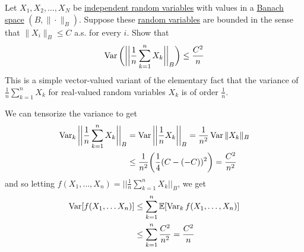   \begin{exercise}
  Let $X_1, X_2, \ldots, X_N$ be \hyperref[prob-def:independent-random-variables]{independent random variables} with values in a \hyperref[mv-def:banach-space]{Banach space} $(B, \|\cdot \|_B)$. Suppose these \hyperref[prob-def:random-variable]{random variables} are bounded in the sense that $\|X_i\|_B \leq C$ a.s. for every $i$. Show that 
  \begin{equation}
    \operatorname{Var}\bigg( \bigg| \bigg| \frac{1}{n} \sum_{k=1}^n X_k \bigg| \bigg|_B \bigg) \leq \frac{C^2}{n}
  \end{equation}
  This is a simple vector-valued variant of the elementary fact that the variance of $\frac{1}{n} \sum_{k=1}^n X_k$ for real-valued random variables $X_k$ is of order $\frac{1}{n}$. 
  \end{exercise}
  \begin{solution}
  We can tensorize the variance to get 
  \begin{align*}
      \operatorname{Var}_k \bigg| \bigg| \frac{1}{n} \sum_{k=1}^n X_k \bigg| \bigg|_B & = \operatorname{Var} \bigg| \bigg| \frac{1}{n} X_k \bigg| \bigg|_B = \frac{1}{n^2} \operatorname{Var} \|X_k\|_B \\
      & \leq \frac{1}{n^2} \bigg( \frac{1}{4} (C - (-C))^2 \bigg) = \frac{C^2}{n^2} 
  \end{align*}
  and so letting $f(X_1, \ldots, X_n) = \big| \big| \frac{1}{n} \sum_{k=1}^n X_k \big| \big|_B$, we get 
  \begin{align*}
      \operatorname{Var} [f(X_1, \ldots X_n)] & \leq \sum_{k=1}^n \mathbb{E}[ \operatorname{Var}_k f (X_1, \ldots, X_n)] \\
      & \leq \sum_{k=1}^n \frac{C^2}{n^2} = \frac{C^2}{n} 
  \end{align*}
  \end{solution}

